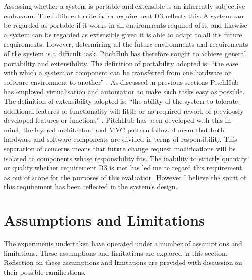 Assessing whether a system is portable and extensible is an inherently subjective endeavour. The fulfilment criteria for requirement D3 reflects this. A system can be regarded as portable if it works in all environments required of it, and likewise a system can be regarded as extensible given it is able to adapt to all it's future requirements. However, determining all the future environments and requirements of the system is a difficult task. PitchHub has therefore sought to achieve general portability and extensibility. The definition of portability adopted is: ``the ease with which a system or component can be transferred from one hardware or software environment to another'' \cite{mattsson2006software}. As discussed in previous sections PitchHub has employed virtualisation and automation to make such tasks easy as possible. The definition of extensibility adopted is: ``the ability of the system to tolerate additional features or functionality will little or no required rework of previously developed features or functions'' \cite{Extensibility:online}. PitchHub has been developed with this in mind, the layered architecture and MVC pattern followed mean that both hardware and software components are divided in terms of responsibility. This separation of concerns means that future change request modifications will be isolated to components whose responsibility fits. The inability to strictly quantify or qualify whether requirement D3 is met has led me to regard this requirement as out of scope for the purposes of this evaluation. However I believe the spirit of this requirement has been reflected in the system's design.

\section{Assumptions and Limitations}
The experiments undertaken have operated under a number of assumptions and limitations. These assumptions and limitations are explored in this section. Reflection on these assumptions and limitations are provided with discussion on their possible ramifications.

